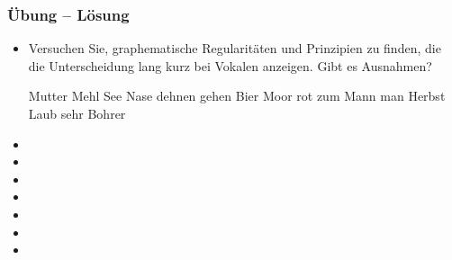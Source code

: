 
\begin{frame}
\frametitle{Übung -- Lösung}

\begin{itemize}	
	\item Versuchen Sie, graphematische Regularitäten und Prinzipien zu finden, die die Unterscheidung lang \vs kurz bei Vokalen anzeigen. Gibt es Ausnahmen?\\
	
	
	\begin{exe}
		\begin{xlist}
			\begin{multicols}{4}
				\ex Mutter
				\ex Mehl
				\ex See
				\ex Nase
				\ex dehnen
				\ex gehen
				\ex Bier
				\ex Moor
				\ex rot
				\ex zum
				\ex Mann
				\ex man
				\ex Herbst
				\ex Laub
				\ex sehr
				\ex Bohrer
			\end{multicols}
		\end{xlist}
	\end{exe}
	
\end{itemize}



\begin{multicols}{2}
\begin{itemize}
\item[\alertred{--}] 
\item[\alertred{--}] 
\item[\alertred{--}] 
\item[\alertred{--}] 
\item[\alertred{--}] 
\item[\alertred{--}] 
\item[\alertred{--}] 
\end{itemize}
\end{multicols}

\end{frame}

